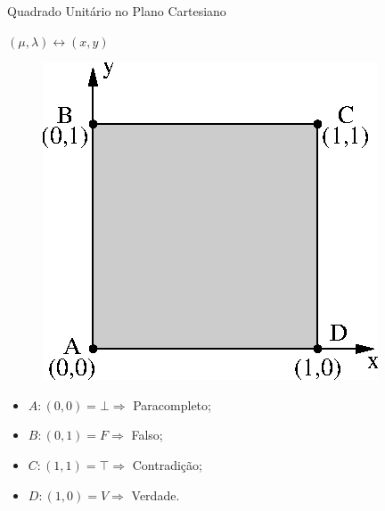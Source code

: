 \begin{frame}{Quadrado Unitário no Plano Cartesiano}

\begin{block}{ \centering   $(\mu, \lambda ) \leftrightarrow (x,y) $ } \end{block}
\vspace{1cm}
\begin{minipage}{0.40\linewidth}
\begin{figure}[!htb]
\center\includegraphics[scale=1.0]{./imagens/C422qupc.eps}
\label{fig:reticuladoQUPC}
\end{figure}
\end{minipage}
\begin{minipage}{0.55\linewidth}
\center
\begin{itemize}
\item $A: (0,0) = \bot \Rightarrow $ Paracompleto;
\item $B: (0,1) = F \Rightarrow $ Falso;
\item $C: (1,1) = \top \Rightarrow $ Contradição;
\item $D: (1,0) = V \Rightarrow $ Verdade.
\end{itemize}
\end{minipage}

\end{frame}

